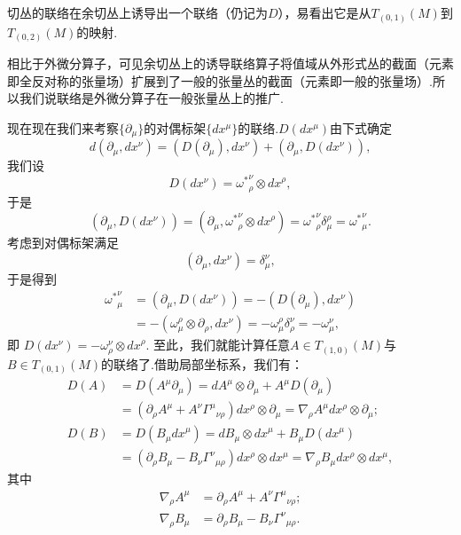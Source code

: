 		切丛的联络在余切丛上诱导出一个联络（仍记为$D$），易看出它是从$T_{(0,1)}(M)$到$T_{(0,2)}(M)$的映射.
		\begin{remark}
			相比于外微分算子，可见余切丛上的诱导联络算子将值域从外形式丛的截面（元素即全反对称的张量场）扩展到了一般的张量丛的截面（元素即一般的张量场）.所以我们说联络是外微分算子在一般张量丛上的推广.
		\end{remark}
		现在现在我们来考察$\{\partial_\mu\}$的对偶标架$\{dx^\mu\}$的联络.$D(dx^\mu)$由下式确定
		$$d\left(\partial_\mu,dx^\nu\right)=\left(D(\partial_\mu),dx^\nu\right)+\left(\partial_\mu,D(dx^\nu)\right),$$
		我们设
		$$D(dx^\nu)={\omega^*}^\nu_\rho\otimes{dx}^\rho,$$
		于是
		$$\left(\partial_\mu,D(dx^\nu)\right)=\left(\partial_\mu,{\omega^*}^\nu_\rho\otimes{dx}^\rho\right)={\omega^*}^\nu_\rho\delta^\rho_\mu={\omega^*}^\nu_\mu.$$
		考虑到对偶标架满足
		$$\left(\partial_\mu,dx^\nu\right)=\delta^\nu_\mu,$$ 
		于是得到								 
		\begin{equation}
			\begin{split}
				{\omega^*}^\nu_\mu&=\left(\partial_\mu,D(dx^\nu)\right)=-\left(D(\partial_\mu),dx^\nu\right)\\
				&=-\left(\omega^\rho_\mu\otimes\partial_\rho,dx^\nu\right)=-{\omega}^\rho_\mu\delta^\nu_\rho=-{\omega}^\nu_\mu,
			\end{split}
		\end{equation}								 
		即
		$D(dx^\nu)=-{\omega}^\nu_\rho\otimes{dx}^\rho$.
		至此，我们就能计算任意$A\in T_{(1,0)}(M)$与$B\in T_{(0,1)}(M)$的联络了.借助局部坐标系，我们有：								 
		\begin{equation}
			\begin{split}
				D(A)&=D(A^\mu\partial_\mu)=dA^\mu\otimes\partial_\mu+A^{\mu}D(\partial_\mu)\\
				&=(\partial_{\rho}A^\mu+A^{\nu}{\Gamma^\mu}_{\nu\rho})dx^\rho{\otimes}\partial_\mu=\nabla_{\rho}A^{\mu}dx^\rho{\otimes}\partial_\mu;\\
				D(B)&=D(B_{\mu}{dx}^\mu)=dB_\mu\otimes{dx}^\mu+B_{\mu}D({dx}^\mu)\\
				&=(\partial_{\rho}B_\mu-B_\nu{\Gamma^\nu}_{\mu\rho})dx^\rho{\otimes}dx^\mu=\nabla_{\rho}B_{\mu}dx^\rho{\otimes}dx^\mu,
			\end{split}	
		\end{equation}
		其中									 
		\begin{equation}
			\begin{split}
				\nabla_{\rho}A^\mu&=\partial_{\rho}A^\mu+A^{\nu}{\Gamma^\mu}_{\nu\rho};\\
				\nabla_{\rho}B_{\mu}&=\partial_{\rho}B_\mu-B_\nu{\Gamma^\nu}_{\mu\rho}.
			\end{split}		
		\end{equation}								
